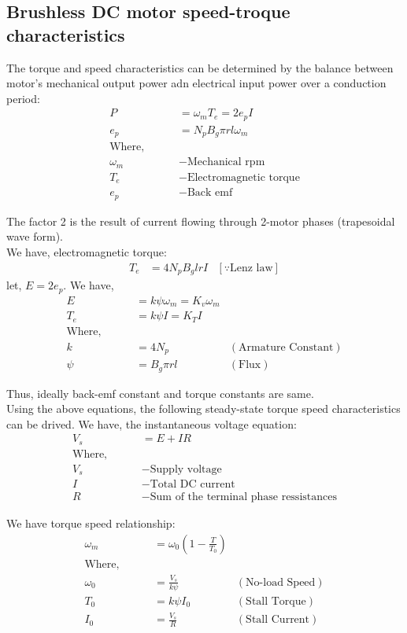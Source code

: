 \subsection{Brushless DC motor speed-troque characteristics \cite{crowder2019electric}}
The torque and speed characteristics can be determined by the balance between motor's mechanical output power adn electrical input power over a conduction period:
\begin{align*}
    P &= \omega_m T_e = 2 e_p I\\
    e_p &= N_p B_g \pi r l \omega_m\\
    \text{Where, } \qquad &\\
    \omega_m &- \text{Mechanical rpm}\\
    T_e      &- \text{Electromagnetic torque}\\
    e_p      &- \text{Back emf}
\end{align*}

The factor 2 is the result of current flowing through 2-motor phases (trapesoidal wave form).\\

We have, electromagnetic torque:
\begin{align*}
    T_e &= 4 N_p B_g l r I &[\because \text{Lenz law}]
\end{align*}
let, $E = 2 e_p$. We have,
\begin{align*}
    E &= k \psi \omega_m = K_v \omega_m\\
    T_e &= k \psi I = K_T I\\
\text{Where, } \qquad &\\
    k &= 4 N_p  &(\text{Armature Constant})\\
    \psi &= B_g \pi  r l  &(\text{Flux})
\end{align*}

Thus, ideally back-emf constant and torque constants are same.\\

Using the above equations, the following steady-state torque speed characteristics can be drived. We have, the instantaneous voltage equation:
\begin{align*}
    V_s &= E + I R\\
\text{Where, } \qquad &\\
    V_s &- \text{Supply voltage}\\
    I &- \text{Total DC current}\\
    R &- \text{Sum of the terminal phase ressistances}
\end{align*}

We have torque speed relationship:
\begin{align*}
    \omega_m &= \omega_0 \left( 1 - \frac{T}{T_0} \right)\\
\text{Where, } \qquad &\\
    \omega_0 &= \frac{V_s}{k \psi} & (\text{No-load Speed})\\
    T_0 &= k \psi I_0              & (\text{Stall Torque})\\
    I_0 &= \frac{V_s}{R}           & (\text{Stall Current})
\end{align*}
